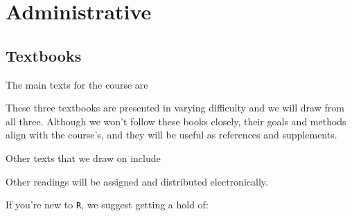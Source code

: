 \documentclass[12pt]{article}
\begin{document}
\section*{Administrative}

\subsection*{Textbooks}

The main texts for the course are

\begin{verse}  \end{verse}

\begin{verse}  \end{verse}

\begin{verse}  \end{verse}

These three textbooks are presented in varying difficulty and we will draw from all three. Although we won't follow these books closely, their goals and methods align with the course's, and they will be useful as references and supplements.

Other texts that we draw on include

\begin{verse}   \end{verse}

\begin{verse}  \end{verse}

\begin{verse}  \end{verse}

\begin{verse}  \end{verse}

Other readings will be assigned and distributed electronically.

If you're new to \texttt{R}, we suggest getting a hold of:

\begin{verse}   \end{verse}

\begin{verse}  \end{verse}
\end{document}
